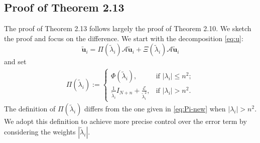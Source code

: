 \documentclass[reqno]{amsart}
\theoremstyle{plain}
\theoremstyle{definition}
\begin{document}
\subsection{Proof of Theorem 2.13}\label{sec:proofweighted}The proof of Theorem 2.13 follows largely the proof of Theorem  2.10. We sketch the proof and focus on the difference. 
We start with the decomposition \eqref{eq:u}:
$$\widetilde{\mathbf u}_i=\Pi(\widetilde \lambda_i) \mathcal A \widetilde{\mathbf u}_i + \Xi(\widetilde \lambda_i) \mathcal A \widetilde{\mathbf u}_i$$
and set
\begin{align}\label{eq:Pi-new01}
\Pi(\widetilde \lambda_i):=\begin{cases}
\Phi(\widetilde \lambda_i), &\text{if } |\lambda_i|\le n^2; \\
\frac{1}{\widetilde \lambda_i} I_{N+n} + \frac{\mathcal E}{\widetilde \lambda_i^2}, &\text{if } |\lambda_i| > n^2.
\end{cases}
\end{align} 
The definition of $\Pi(\widetilde \lambda_i)$ differs from the one given in \eqref{eq:Pi-new} when $|\lambda_i| > n^2$. We adopt this definition to achieve more precise control over the error term by considering the weights $|\widetilde \lambda_i|$.
\end{document}
